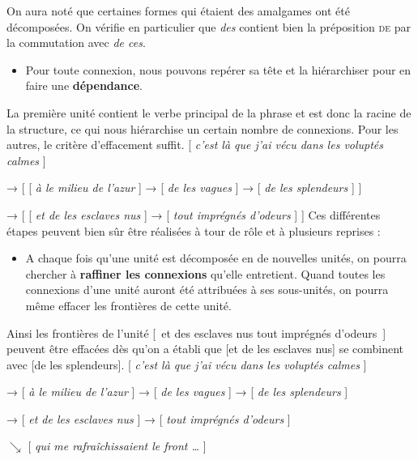On aura noté que certaines formes qui étaient des amalgames ont été décomposées. On vérifie en particulier que \textit{des} contient bien la préposition \textsc{de} par la commutation avec \textit{de ces}.

\begin{itemize}
\item \begin{styleLivreImportant}
Pour toute connexion, nous pouvons repérer sa tête et la hiérarchiser pour en faire une \textbf{dépendance}.
\end{styleLivreImportant}
\end{itemize}

La première unité contient le verbe principal de la phrase et est donc la racine de la structure, ce qui nous hiérarchise un certain nombre de connexions. Pour les autres, le critère d’effacement suffit.
\ea{}
[ \textit{c’est là que j’ai vécu dans les voluptés calmes} ]

→ [ [ \textit{à le milieu de l’azur} ] → [ \textit{de les vagues} ] → [ \textit{de les splendeurs} ] ]

→ [ [ \textit{et de les esclaves nus} ] → [ \textit{tout imprégnés d’odeurs} ] ]
\z
Ces différentes étapes peuvent bien sûr être réalisées à tour de rôle et à plusieurs reprises :

\begin{itemize}
\item \begin{styleLivreImportant}
A chaque fois qu’une unité est décomposée en de nouvelles unités, on pourra chercher à \textbf{raffiner les connexions} qu’elle entretient. Quand toutes les connexions d’une unité auront été attribuées à ses sous-unités, on pourra même effacer les frontières de cette unité.
\end{styleLivreImportant}
\end{itemize}

Ainsi les frontières de l’unité [~et des esclaves nus tout imprégnés d’odeurs~] peuvent être effacées dès qu’on a établi que [et de les esclaves nus] se combinent avec [de les splendeurs].
\ea{}
[ \textit{c’est là que j’ai vécu dans les voluptés calmes} ]

→ [ \textit{à le milieu de l’azur} ] → [ \textit{de les vagues} ] → [ \textit{de les splendeurs} ]

→ [ \textit{et de les esclaves nus} ] → [ \textit{tout imprégnés d’odeurs} ]

                                             $\searrow $ [ \textit{qui me rafraîchissaient le front …} ]
\z

